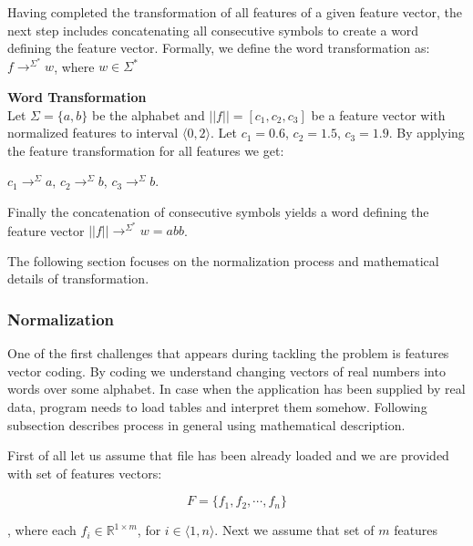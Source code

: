 \documentclass{mini}
\newcommand{\featureTransformationSymbol}[1]{
    \rightarrow^{#1}
}
\newcommand{\featureTransformationWord}[1]{
    \rightarrow^{#1^{*}}
}
\newcommand{\featureNorm}[1]{
    ||#1||
}
\begin{document}
Having completed the transformation of all features of a given feature vector, the next step includes concatenating all consecutive symbols to create a word defining the feature vector. Formally, we define the word transformation as: $f \featureTransformationWord{\Sigma} w$, where $w \in \Sigma^*$ 

        
\begin{example} {\bf Word Transformation}\\
    Let $\Sigma =\{a,b\}$ be the alphabet and $\featureNorm{f} = [c_{1},c_{2},c_{3}]$ be a feature vector with normalized features to interval $\langle 0,2 \rangle$.
    Let $c_{1}=0.6$, $c_{2} = 1.5$, $c_{3} = 1.9$.
    By applying the feature transformation for all features we get:
    \begin{center}
        $c_{1} \featureTransformationSymbol{\Sigma} a$,
        $c_{2} \featureTransformationSymbol{\Sigma} b$,
        $c_{3} \featureTransformationSymbol{\Sigma} b$.
    \end{center}
    Finally the concatenation of consecutive symbols yields a word defining the feature vector $\featureNorm{f} \featureTransformationWord{\Sigma} w = abb$.
\end{example}

The following section focuses on the normalization process and mathematical details of transformation.

\subsubsection{Normalization} \label{sec:lan_theory_word_transf_norm}
One of the first challenges that appears during tackling the problem is features vector coding. By coding we understand changing vectors of real numbers into words over some alphabet. In case when the application has been supplied by real data, program needs to load tables and interpret them somehow. Following subsection describes process in general using mathematical description.

First of all let us assume that file has been already loaded and we are provided with set of features vectors: 

\[ F = \{ f_1 , f_2, \cdots , f_n \} \]

, where each $f_i \in \mathbb{R}^{1 \times m}$, for $i \in \langle 1,n \rangle$.
Next we assume that set of $m$ features 
\end{document}
